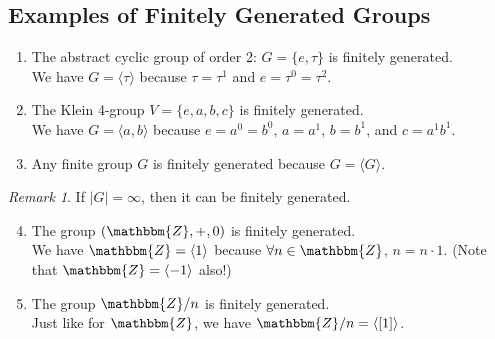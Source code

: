 \documentclass{article}
\newcommand{\Z}{\mathbbm{Z}}
\theoremstyle{definition}
\theoremstyle{remark}
\newtheorem*{rmk}{Remark}
\begin{document}
{        \subsection*{Examples of Finitely Generated Groups}{
            \begin{enumerate}
                \item The abstract cyclic group of order 2: $G=\{e,\tau\}$ is finitely generated.\\
                We have $G=\langle \tau\rangle$ because $\tau=\tau^1$ and $e=\tau^0=\tau^2$.
                \item The Klein 4-group $V=\{e,a,b,c\}$ is finitely generated.\\
                We have $G=\langle a,b\rangle$ because $e=a^0=b^0$, $a=a^1$, $b=b^1$, and $c=a^1b^1$.
                \item Any finite group $G$ is finitely generated because $G=\langle G\rangle$.
            \end{enumerate} 
            
            \begin{rmk}
                If $|G|= \infty$, then it can be finitely generated.
            \end{rmk}
            
            \begin{enumerate}\setcounter{enumi}{3}
                \item The group $(\Z,+,0)$ is finitely generated.\\
                We have $\Z=\langle1\rangle$ because $\forall n \in \Z$, $n=n\cdot 1$. (Note that $\Z=\langle-1\rangle$ also!)
                \item The group $\Z/n$ is finitely generated.\\
                Just like for $\Z$, we have $\Z/n=\langle[1]\rangle$.
            \end{enumerate}
            
}}
\end{document}
